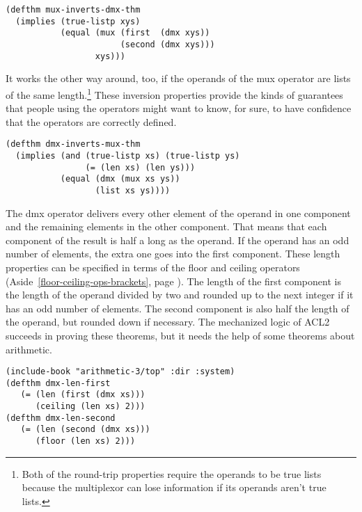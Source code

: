 \label{thm:mux-inverts-dmx}
\begin{Verbatim}
(defthm mux-inverts-dmx-thm
  (implies (true-listp xys)
           (equal (mux (first  (dmx xys))
                       (second (dmx xys)))
                  xys)))
\end{Verbatim}

It works the other way around, too, if the operands of
the mux operator are lists of the same length.\footnote{Both
of the round-trip properties require the operands to be
true lists because the multiplexor can lose information
if its operands aren't true lists.}
These inversion properties provide the kinds
of guarantees that people using the operators
might want to know, for sure, to have confidence that
the operators are correctly defined.

\label{thm:dmx-inverts-mux}
\begin{Verbatim}
(defthm dmx-inverts-mux-thm
  (implies (and (true-listp xs) (true-listp ys)
                (= (len xs) (len ys)))
           (equal (dmx (mux xs ys))
                  (list xs ys))))
\end{Verbatim}

The dmx operator delivers every other element of the operand in
one component and the remaining elements in the other component.
That means that each component of the result is half a long as the operand.
If the operand has an odd number of elements, the extra one goes into the first component.
These length properties can be specified in terms of the floor and ceiling
operators (Aside~\ref{floor-ceiling-ops-brackets}, page \pageref{floor-ceiling-ops-brackets}).
The length of the first component is the length of the operand divided by two
and rounded up to the next integer if it has an odd number of elements.
The second component is also half the length of the operand, but rounded down if necessary.
The mechanized logic of ACL2 succeeds in proving these theorems,
but it needs the help of some theorems about arithmetic.

\label{thm:dmx-length-first-second}
\begin{Verbatim}
(include-book "arithmetic-3/top" :dir :system)
(defthm dmx-len-first
   (= (len (first (dmx xs)))
      (ceiling (len xs) 2)))
(defthm dmx-len-second
   (= (len (second (dmx xs)))
      (floor (len xs) 2)))
\end{Verbatim}

